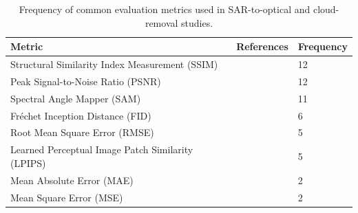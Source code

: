 \begin{table}[h!]
\centering
\begin{tabular}{lll}
\toprule
\textbf{Metric} & \textbf{References} & \textbf{Frequency} \\
\midrule
Structural Similarity Index Measurement (SSIM)~\cite{iqa_ssim}
 & \cite{CR_Advances_Review_ORS, RS_Data_Fusion_GANs_sota, DiffCR, c_diffusion_s2o, s2o_ViT_cGAN, S2MS_GAN, c_guided_fus_s2ot, transfusion_cr, trans_gan_CF, hvt_cgan, msf_gan, diffusion_memory} 
 & 12 \\
Peak Signal-to-Noise Ratio (PSNR)~\cite{iqa_psnr}
 & \cite{CR_Advances_Review_ORS, DiffCR, CR_RS_spati_atten_GAN, s2o_ViT_cGAN, CR_RS_GAN_s2o, S2MS_GAN, c_guided_fus_s2ot, transfusion_cr, trans_gan_CF, hvt_cgan, msf_gan, diffusion_memory} 
 & 12 \\
Spectral Angle Mapper (SAM)~\cite{iqa_sam}
 & \cite{aCGAN_fuse_sar_MS, RS_Data_Fusion_GANs_sota, CR_RS_GAN_s2o, S2MS_GAN, c_guided_fus_s2ot, transfusion_cr, trans_gan_CF, cond_brownian, hvt_cgan, msf_gan} 
 & 11 \\
Fréchet Inception Distance (FID)~\cite{iqa_fid}
 & \cite{DiffCR, c_diffusion_s2o, s2o_ViT_cGAN, cond_brownian, hvt_cgan, msf_gan} 
 & 6 \\
Root Mean Square Error (RMSE) 
 & \cite{aCGAN_fuse_sar_MS, CR_Advances_Review_ORS, RS_Data_Fusion_GANs_sota, CR_RS_GAN_s2o, c_guided_fus_s2ot} 
 & 5 \\
Learned Perceptual Image Patch Similarity (LPIPS)~\cite{iqa_lpips}
 & \cite{CR_Advances_Review_ORS, DiffCR, S2MS_GAN, cond_brownian, diffusion_memory} 
 & 5 \\
Mean Absolute Error (MAE) 
 & \cite{CR_RS_GAN_s2o, c_guided_fus_s2ot} 
 & 2 \\
Mean Square Error (MSE) 
 & \cite{CR_RS_spati_atten_GAN, trans_gan_CF} 
 & 2 \\
\bottomrule
\end{tabular}
\caption[Common evaluation metrics in SAR-to-optical and cloud removal]{Frequency of common evaluation metrics used in SAR-to-optical and cloud-removal studies.}
\label{tab:iqa}
\end{table}

